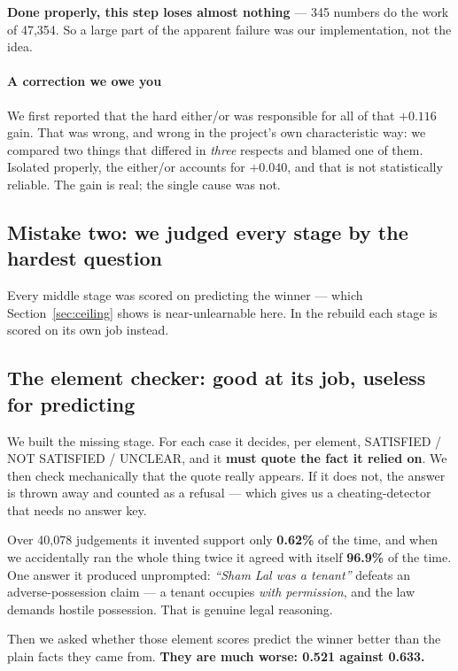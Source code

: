 \documentclass[12pt,a4paper]{article}
\begin{document}
\textbf{Done properly, this step loses almost nothing} --- 345 numbers do the work of 47,354. So a
large part of the apparent failure was our implementation, not the idea.

\paragraph{A correction we owe you} We first reported that the hard either/or was responsible for all
of that $+0.116$ gain. That was wrong, and wrong in the project's own characteristic way: we compared
two things that differed in \emph{three} respects and blamed one of them. Isolated properly, the
either/or accounts for $+0.040$, and that is not statistically reliable. The gain is real; the single
cause was not.

\subsection{Mistake two: we judged every stage by the hardest question}

Every middle stage was scored on predicting the winner --- which Section~\ref{sec:ceiling} shows is
near-unlearnable here. In the rebuild each stage is scored on its own job instead.

\subsection{The element checker: good at its job, useless for predicting}

We built the missing stage. For each case it decides, per element, SATISFIED / NOT SATISFIED /
UNCLEAR, and it \textbf{must quote the fact it relied on}. We then check mechanically that the quote
really appears. If it does not, the answer is thrown away and counted as a refusal --- which gives us
a cheating-detector that needs no answer key.

Over 40,078 judgements it invented support only \textbf{0.62\%} of the time, and when we accidentally
ran the whole thing twice it agreed with itself \textbf{96.9\%} of the time. One answer it produced
unprompted: \emph{``Sham Lal was a tenant''} defeats an adverse-possession claim --- a tenant occupies
\emph{with permission}, and the law demands hostile possession. That is genuine legal reasoning.

Then we asked whether those element scores predict the winner better than the plain facts they came
from. \textbf{They are much worse: 0.521 against 0.633.}
\end{document}
